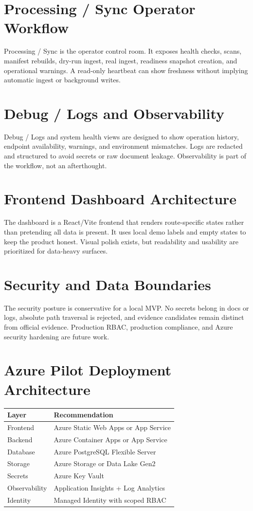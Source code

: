 \documentclass[11pt]{article}
\begin{document}
\section{Processing / Sync Operator Workflow}
Processing / Sync is the operator control room. It exposes health checks, scans, manifest rebuilds, dry-run ingest, real ingest, readiness snapshot creation, and operational warnings. A read-only heartbeat can show freshness without implying automatic ingest or background writes.

\section{Debug / Logs and Observability}
Debug / Logs and system health views are designed to show operation history, endpoint availability, warnings, and environment mismatches. Logs are redacted and structured to avoid secrets or raw document leakage. Observability is part of the workflow, not an afterthought.

\section{Frontend Dashboard Architecture}
The dashboard is a React/Vite frontend that renders route-specific states rather than pretending all data is present. It uses local demo labels and empty states to keep the product honest. Visual polish exists, but readability and usability are prioritized for data-heavy surfaces.

\section{Security and Data Boundaries}
The security posture is conservative for a local MVP. No secrets belong in docs or logs, absolute path traversal is rejected, and evidence candidates remain distinct from official evidence. Production RBAC, production compliance, and Azure security hardening are future work.

\section{Azure Pilot Deployment Architecture}
\begin{tabularx}{\textwidth}{@{}lX@{}}
\toprule
Layer & Recommendation \\
\midrule
Frontend & Azure Static Web Apps or App Service \\
Backend & Azure Container Apps or App Service \\
Database & Azure PostgreSQL Flexible Server \\
Storage & Azure Storage or Data Lake Gen2 \\
Secrets & Azure Key Vault \\
Observability & Application Insights + Log Analytics \\
Identity & Managed Identity with scoped RBAC \\
\bottomrule
\end{tabularx}
\end{document}
